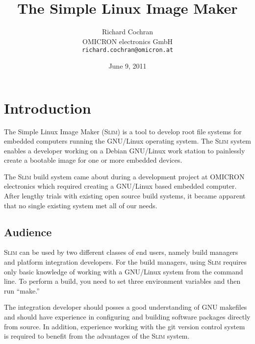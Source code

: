 \documentclass[a4paper,10pt]{article}
\newcommand{\slim}{\textsc{Slim}\xspace}
\begin{document}
\title{
  The Simple Linux Image Maker
}
\author{
  Richard Cochran \\
  OMICRON electronics GmbH \\
  {\tt richard.cochran@omicron.at}
}
\date{June 9, 2011}
\maketitle
\newpage
\tableofcontents
\newpage

\setlength{\parindent}{0pt}
\setlength{\parskip}{\baselineskip}

\section{Introduction}

    The Simple Linux Image Maker (\slim) is a tool to develop root
    file systems for embedded computers running the GNU/Linux
    operating system. The \slim system enables a developer working on
    a Debian GNU/Linux work station to painlessly create a bootable
    image for one or more embedded devices.

    The \slim build system came about during a development project at
    OMICRON electronics which required creating a GNU/Linux based
    embedded computer. After lengthy trials with existing open source
    build systems, it became apparent that no single existing system
    met all of our needs.

\subsection{Audience}

    \slim can be used by two different classes of end users, namely
    build managers and platform integration developers. For the build
    managers, using \slim requires only basic knowledge of working
    with a GNU/Linux system from the command line. To perform a build,
    you need to set three environment variables and then run ``make.''

    The integration developer should posses a good understanding of
    GNU makefiles and should have experience in configuring and
    building software packages directly from source. In addition,
    experience working with the git version control system is required
    to benefit from the advantages of the \slim system.
\end{document}
